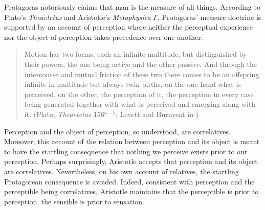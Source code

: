 Protagoras notoriously claims that man is the measure of all things. According to Plato's \emph{Theaetetus} and Aristotle's \emph{Metaphysica} \( \Gamma \), Protagoras' measure doctrine is supported by an account of perception where neither the perceptual experience nor the object of perception takes precedence over one another: 
\begin{quote}
	Motion has two forms, each an infinite multitude, but distinguished by their powers, the one being active and the other passive. And through the intercourse and mutual friction of these two there comes to be an offspring infinite in multitude but always twin births, on the one hand what is perceived, on the other, the perception of it, the perception in every case being generated together with what is perceived and emerging along with it. (Plato, \emph{Theaetetus} 156\( ^{a-b} \); Levett and Burnyeat in \citealt[173--174]{Cooper:1997fk})
\end{quote}
Perception and the object of perception, so understood, are correlatives. Moreover, this account of the relation between perception and its object is meant to have the startling consequence that nothing we perceive exists prior to our perception. Perhaps surprisingly, Aristotle accepts that perception and its object are correlatives. Nevertheless, on his own account of relatives, the startling Protagorean consequence is avoided. Indeed, consistent with perception and the perceptible being correlatives, Aristotle maintains that the perceptible is prior to perception, the sensible is prior to sensation.


